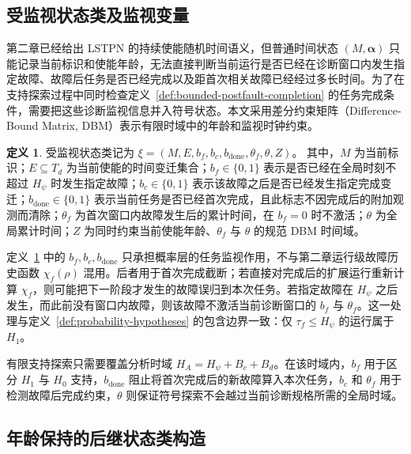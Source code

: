 \documentclass[master,fontset=ubuntu]{shnuthesis}
\theoremstyle{definition}
\newtheorem{thesisdefinition}{定义}
\begin{document}
\subsection{受监视状态类及监视变量}

第二章已经给出 LSTPN 的持续使能随机时间语义，但普通时间状态 \((M,\boldsymbol\alpha)\) 只能记录当前标识和使能年龄，无法直接判断当前运行是否已经在诊断窗口内发生指定故障、故障后任务是否已经完成以及距首次相关故障已经经过多长时间。为了在支持探索过程中同时检查定义~\ref{def:bounded-postfault-completion} 的任务完成条件，需要把这些诊断监视信息并入符号状态。本文采用差分约束矩阵（Difference-Bound Matrix, DBM）表示有限时域中的年龄和监视时钟约束\cite{Basile2015,Basile2017}。

\begin{thesisdefinition}
\label{def:monitored-class}
受监视状态类记为
\(\xi=(M,E,b_f,b_c,b_{\mathrm{done}},\theta_f,\theta,Z)\)。
其中，\(M\) 为当前标识；\(E\subseteq T_d\) 为当前使能的时间变迁集合；\(b_f\in\{0,1\}\) 表示是否已经在全局时刻不超过 \(H_\psi\) 时发生指定故障；\(b_c\in\{0,1\}\) 表示该故障之后是否已经发生指定完成变迁；\(b_{\mathrm{done}}\in\{0,1\}\) 表示当前任务是否已经首次完成，且此标志不因完成后的附加观测而清除；\(\theta_f\) 为首次窗口内故障发生后的累计时间，在 \(b_f=0\) 时不激活；\(\theta\) 为全局累计时间；\(Z\) 为同时约束当前使能年龄、\(\theta_f\) 与 \(\theta\) 的规范 DBM 时间域。
\end{thesisdefinition}

定义~\ref{def:monitored-class} 中的 \(b_f,b_c,b_{\mathrm{done}}\) 只承担概率层的任务监视作用，不与第二章运行级故障历史函数 \(\chi_f(\rho)\) 混用。后者用于首次完成截断；若直接对完成后的扩展运行重新计算 \(\chi_f\)，则可能把下一阶段才发生的故障误归到本次任务。若指定故障在 \(H_\psi\) 之后发生，而此前没有窗口内故障，则该故障不激活当前诊断窗口的 \(b_f\) 与 \(\theta_f\)。这一处理与定义~\ref{def:probability-hypotheses} 的包含边界一致：仅 \(\tau_f\leq H_\psi\) 的运行属于 \(H_1\)。

有限支持探索只需要覆盖分析时域 \(H_A=H_\psi+B_c+B_d\)。在该时域内，\(b_f\) 用于区分 \(H_1\) 与 \(H_0\) 支持，\(b_{\mathrm{done}}\) 阻止将首次完成后的新故障算入本次任务，\(b_c\) 和 \(\theta_f\) 用于检测故障后完成约束，\(\theta\) 则保证符号探索不会越过当前诊断规格所需的全局时域。

\subsection{年龄保持的后继状态类构造}
\end{document}
